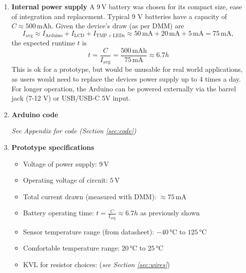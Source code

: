 \documentclass[10pt]{article}
\begin{document}
\begin{enumerate}[label=\Alph*.]
	\item \textbf{Internal power supply} A $9\,$V battery was chosen for its
	      compact size, ease of integration and replacement. Typical 9 V batteries
	      have a capacity of $C\approx500\,$mAh. Given the device's draw (as per DMM) are
	      \[
		      I_{\mathrm{avg}} \approx I_{\mathrm{Arduino}} +
		      I_{\mathrm{LCD}} + I_{\mathrm{TMP+LEDs}} \approx
		      50\mathrm{\,mA}+20\mathrm{\,mA}+5\mathrm{\,mA}=75\mathrm{\,mA},
	      \]
	      the expected runtime $t$ is
	      \[
		      t = \frac{C}{I_{\mathrm{avg}}} =
		      \frac{500\mathrm{\,mAh}}{75\mathrm{\,mA}} \approx 6.7 h
	      \]
	      This is ok for a
	      prototype, but would be unusable for real world applications, as users would
	      need to replace the devices power supply up to 4 times a day.  For longer
	      operation, the Arduino can be powered externally via the barrel jack (7-12
	      V) or USB/USB-C 5V input.

	\item \textbf{Arduino code}


	      \begin{center}
		      \textit{See Appendix for code (Section \ref{sec:code})}
	      \end{center}

	\item \textbf{Prototype specifications}

	      \begin{itemize}
		      \item Voltage of power supply: $9\,$V
		      \item Operating voltage of circuit: $5\,$V
		      \item Total current drawn (measured with DMM): $\approx75\,$mA
		      \item Battery operating time: $\displaystyle t = \frac{C}{I_{\mathrm{avg}}}\approx6.7 h$ as previously shown
		      \item Sensor temperature range (from datasheet): $-40\,$°C to $125\,$°C
		      \item Comfortable temperature range: $20\,$°C to $25\,$°C
		      \item KVL for resistor choices: (\textit{see Section \ref{sec:wires}})
	      \end{itemize}

\end{enumerate}
\end{document}
